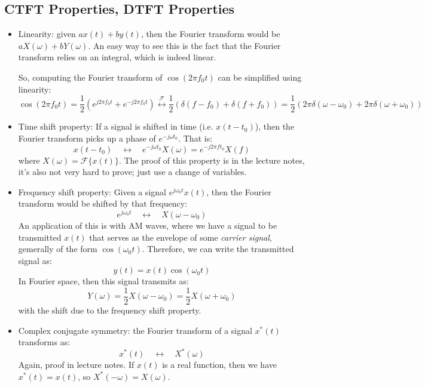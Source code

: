 \subsection{CTFT Properties, DTFT Properties} 
\begin{itemize}
	\item Linearity: given \( ax(t) + by(t) \), then the Fourier transform would be \( aX(\omega) + bY(\omega) \). 
		An easy way to see this is the fact that the Fourier transform relies on an integral, which is indeed 
		linear. 

		So, computing the Fourier transform of \( \cos(2 \pi f_0 t) \) can be simplified using linearity:
		\[
			\cos(2 \pi f_0 t) = \frac{1}{2}(e^{j 2 \pi f_0 t} + e^{- j 2\pi f_0 t}) \overset{\mathcal F}\leftrightarrow
			\frac{1}{2}(\delta(f - f_0) + \delta(f + f_0)) = \frac{1}{2}(2 \pi \delta(\omega - \omega_0) + 
			2\pi \delta(\omega + \omega_0))
		\] 
	\item Time shift property: If a signal is shifted in time (i.e. \( x(t - t_0) \)), then the 
		Fourier transform picks up a phase of \( e^{- j \omega t_0} \). That is:
		\[
		x(t - t_0) \quad \leftrightarrow \quad e^{-j \omega t_0}X(\omega) = e^{- j 2 \pi f t_0} X(f)
		\] 
		where \( X(\omega) = \mathcal F \{x(t)\}  \). The proof of this property is in the lecture notes, 
		it's also not very hard to prove; just use a change of variables. 
	\item Frequency shift property: Given a signal \( e^{j \omega_0 t}x(t) \), then the Fourier transform 
		would be shifted by that frequency:
		\[
		e^{j \omega_0 t}\quad \leftrightarrow \quad X(\omega - \omega_0)
		\] 
		An application of this is with AM waves, where we have a signal to be transmitted \( x(t) \) that serves 
		as the envelope of some \textit{carrier signal}, gemerally of the form \( \cos(\omega_0 t) \). Therefore, 
		we can write the transmitted signal as:
		\[
		y(t) = x(t) \cos(\omega_0 t)
		\] 
		In Fourier space, then this signal transmits as:
		\[
		Y(\omega) = \frac{1}{2}X(\omega - \omega_0) = \frac{1}{2}X(\omega + \omega_0)
		\] 
		with the shift due to the frequency shift property. 
	\item Complex conjugate symmetry: the Fourier transform of a signal \( x^{*}(t) \) transforms as:
		\[
		x^{*}(t) \quad \leftrightarrow \quad X^{*}(\omega)
		\] 
		Again, proof in lecture notes. If \( x(t) \) is a real function, then we have \( x^{*}(t) = x(t) \), 
		so \( X^{*}(-\omega) = X(\omega) \). 


\end{itemize}

